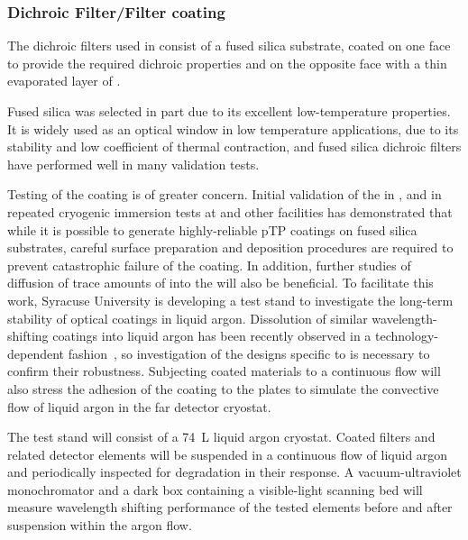 \subsubsection{Dichroic Filter/Filter coating}

The dichroic filters used in  consist of a fused silica substrate, coated on one face to provide the required dichroic properties and on the opposite face with a thin evaporated layer of .

Fused silica was selected in part due to its excellent low-temperature properties.  It is widely used as an optical window in low temperature applications, due to its stability and low coefficient of thermal contraction, and fused silica dichroic filters have performed well in many  validation tests.

Testing of the  coating is of greater concern.  Initial validation of the  in ,  and in repeated cryogenic immersion tests at  and other facilities has demonstrated that while it is possible to generate highly-reliable pTP coatings on fused silica substrates, careful surface preparation and deposition procedures are required to prevent catastrophic failure of the coating.  In addition, further studies of diffusion of trace amounts of  into the  will also be beneficial.  To facilitate this work,  
Syracuse University is 
 developing a test stand to investigate the long-term stability of  optical coatings in liquid argon. Dissolution of similar wavelength-shifting coatings into liquid argon has been recently observed in a technology-dependent fashion~\cite{Asaadi:2018ixs}, so investigation of the designs specific to  is necessary to confirm their robustness. Subjecting coated materials to a continuous flow will also stress the adhesion of the coating to the plates to simulate the convective flow of liquid argon in the far detector cryostat.

The test stand will consist of a \SI{74}{L} liquid argon cryostat. Coated filters and related detector elements will be suspended in a continuous flow of liquid argon and periodically inspected for degradation in their response. A vacuum-ultraviolet monochromator and a dark box containing a visible-light scanning bed will measure wavelength shifting performance of the tested elements before and after suspension within the argon flow.

